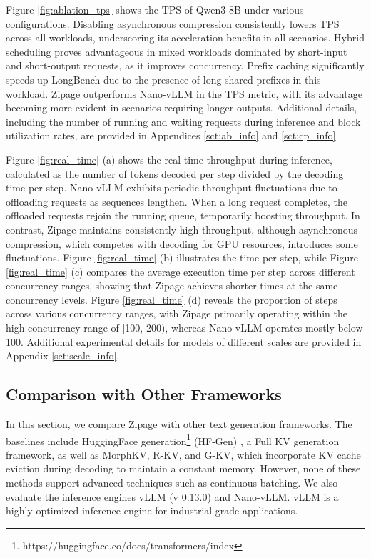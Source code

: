 \documentclass[11pt]{article}
\begin{document}
Figure \ref{fig:ablation_tps} shows the TPS of Qwen3 8B under various configurations. Disabling asynchronous compression consistently lowers TPS across all workloads, underscoring its acceleration benefits in all scenarios. Hybrid scheduling proves advantageous in mixed workloads dominated by short-input and short-output requests, as it improves concurrency. Prefix caching significantly speeds up LongBench due to the presence of long shared prefixes in this workload. Zipage outperforms Nano-vLLM in the TPS metric, with its advantage becoming more evident in scenarios requiring longer outputs. Additional details, including the number of running and waiting requests during inference and block utilization rates, are provided in Appendices \ref{sct:ab_info} and \ref{sct:cp_info}.

Figure \ref{fig:real_time} (a) shows the real-time throughput during inference, calculated as the number of tokens decoded per step divided by the decoding time per step. Nano-vLLM exhibits periodic throughput fluctuations due to offloading requests as sequences lengthen. When a long request completes, the offloaded requests rejoin the running queue, temporarily boosting throughput. In contrast, Zipage maintains consistently high throughput, although asynchronous compression, which competes with decoding for GPU resources, introduces some fluctuations.  
Figure \ref{fig:real_time} (b) illustrates the time per step, while Figure \ref{fig:real_time} (c) compares the average execution time per step across different concurrency ranges, showing that Zipage achieves shorter times at the same concurrency levels. Figure \ref{fig:real_time} (d) reveals the proportion of steps across various concurrency ranges, with Zipage primarily operating within the high-concurrency range of [100, 200), whereas Nano-vLLM operates mostly below 100. Additional experimental details for models of different scales are provided in Appendix \ref{sct:scale_info}.

\subsection{Comparison with Other Frameworks}

In this section, we compare Zipage with other text generation frameworks. The baselines include HuggingFace generation\footnote{https://huggingface.co/docs/transformers/index} (HF-Gen) , a Full KV generation framework, as well as MorphKV, R-KV, and G-KV, which incorporate KV cache eviction during decoding to maintain a constant memory. However, none of these methods support advanced techniques such as continuous batching. We also evaluate the inference engines vLLM (v 0.13.0) and Nano-vLLM. vLLM is a highly optimized inference engine for industrial-grade applications.  
\end{document}
